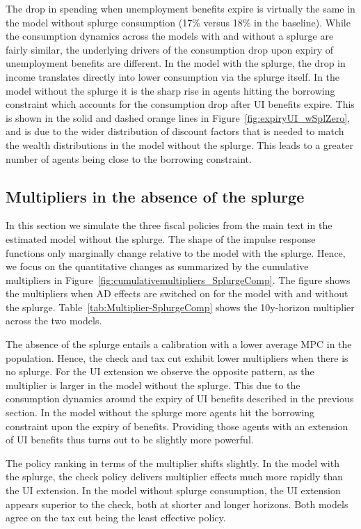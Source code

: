 \documentclass{econsocart}
\begin{document}
The drop in spending when unemployment benefits expire is virtually the same in the model without splurge consumption (17\% versus 18\% in the baseline).
While the consumption dynamics across the models with and without a splurge are fairly similar, the underlying drivers of the consumption drop upon expiry of unemployment benefits are different.
In the model with the splurge, the drop in income translates directly into lower consumption via the splurge itself.
In the model without the splurge it is the sharp rise in agents hitting the borrowing constraint which accounts for the consumption drop after UI benefits expire.
This is shown in the solid and dashed orange lines in Figure~\ref{fig:expiryUI_wSplZero}, and is due to the wider distribution of discount factors that is needed to match the wealth distributions in the model without the splurge. This leads to a greater number of agents being close to the borrowing constraint.



\subsection{Multipliers in the absence of the splurge}
\whenintegrated{\label{app:nosplurge-multipliers}} %

In this section we simulate the three fiscal policies from the main text in the estimated model without the splurge. The shape of the impulse response functions only marginally change relative to the model with the splurge. Hence, we focus on the quantitative changes as summarized by the cumulative multipliers in Figure~\ref{fig:cumulativemultipliers_SplurgeComp}.
The figure shows the multipliers when AD effects are switched on for the model with and without the splurge.
Table~\ref{tab:Multiplier-SplurgeComp} shows the 10y-horizon multiplier across the two models.

The absence of the splurge entails a calibration with a lower average MPC in the population.
Hence, the check and tax cut exhibit lower multipliers when there is no splurge.
For the UI extension we observe the opposite pattern, as the multiplier is larger in the model without the splurge.
This due to the consumption dynamics around the expiry of UI benefits described in the previous section.
In the model without the splurge more agents hit the borrowing constraint upon the expiry of benefits.
Providing those agents with an extension of UI benefits thus turns out to be slightly more powerful.

The policy ranking in terms of the multiplier shifts slightly.
In the model with the splurge, the check policy delivers multiplier effects much more rapidly than the UI extension.
In the model without splurge consumption, the UI extension appears superior to the check, both at shorter and longer horizons.
Both models agree on the tax cut being the least effective policy.





\FloatBarrier

\smartbib
\end{document}
